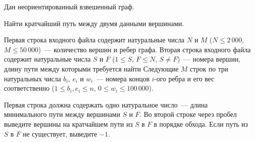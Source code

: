 

Дан неориентированный взвешенный граф.

Найти кратчайший путь между двумя данными вершинами.

\InputFile
Первая строка входного файла содержит натуральные числа $N$ и $M$ ({$N \leqslant 2\,000$}, $M \leqslant 50\,000$)~---
количество вершин и ребер графа.
Вторая строка входного файла содержит натуральные числа $S$ и $F$ ($1 \leqslant S$, $F \leqslant N$, $S \ne F$)~---
номера вершин, длину пути между которыми требуется найти
Следующие $M$ строк по три натуральных числа $b_i$, $e_i$ и $w_i$~--- номера 
концов $i$-ого ребра и его вес соответственно ($1 \leqslant b_i, e_i \leqslant n$, $0 \leqslant w_i \leqslant 100\,000$).

\OutputFile
Первая строка должна содержать одно натуральное число~--- 
длина минимального пути между вершинами $S$ и $F$. Во второй строке через пробел выведите вершины на кратчайшем пути из $S$ в $F$ в порядке обхода.
Если путь из $S$ в $F$ не существует, выведите $-1$.


